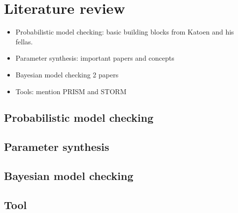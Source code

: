 \chapter{Literature review} 
{\color{red}
  \begin{itemize}
  \item Probabilistic model checking: basic building blocks from Katoen and his
    fellas.
  \item Parameter synthesis: important papers and concepts
  \item Bayesian model checking 2 papers
  \item Tools: mention PRISM and STORM
  \end{itemize}
}


\section{Probabilistic model checking}

\section{Parameter synthesis}


\section{Bayesian model checking}

\section{Tool}

